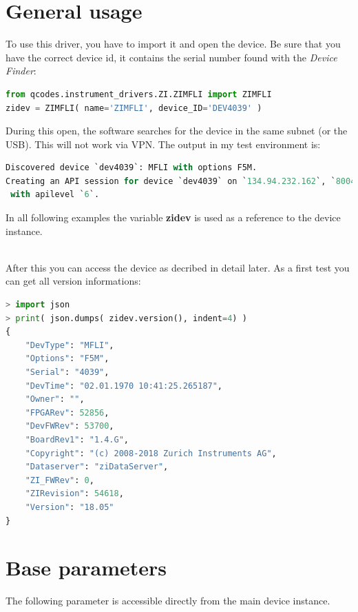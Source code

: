 \documentclass[11pt]{article} %
\begin{document}
\section{General usage}

To use this driver, you have to import it and open the device. Be sure that you have the correct device id, it contains the serial number found with the {\it Device Finder}:

\begin{lstlisting}[frame=single, language=Python]
from qcodes.instrument_drivers.ZI.ZIMFLI import ZIMFLI
zidev = ZIMFLI( name='ZIMFLI', device_ID='DEV4039' )
\end{lstlisting}

During this open, the software searches for the device in the same subnet (or the USB). This will not work via VPN. The output in my test environment is:
\begin{lstlisting}[frame=single, language=Python]
Discovered device `dev4039`: MFLI with options F5M.
Creating an API session for device `dev4039` on `134.94.232.162`, `8004`
 with apilevel `6`.
\end{lstlisting}

In all following examples the variable {\bf zidev} is used as a reference to the device instance.

\ \\

After this you can access the device as decribed in detail later. As a first test you can get all version informations:
\begin{lstlisting}[frame=single, language=Python]
> import json
> print( json.dumps( zidev.version(), indent=4) )
{
    "DevType": "MFLI",
    "Options": "F5M",
    "Serial": "4039",
    "DevTime": "02.01.1970 10:41:25.265187",
    "Owner": "",
    "FPGARev": 52856,
    "DevFWRev": 53700,
    "BoardRev1": "1.4.G",
    "Copyright": "(c) 2008-2018 Zurich Instruments AG",
    "Dataserver": "ziDataServer",
    "ZI_FWRev": 0,
    "ZIRevision": 54618,
    "Version": "18.05"
}
\end{lstlisting}


\clearpage

\section{Base parameters}

The following parameter is accessible directly from the main device instance.
\end{document}
